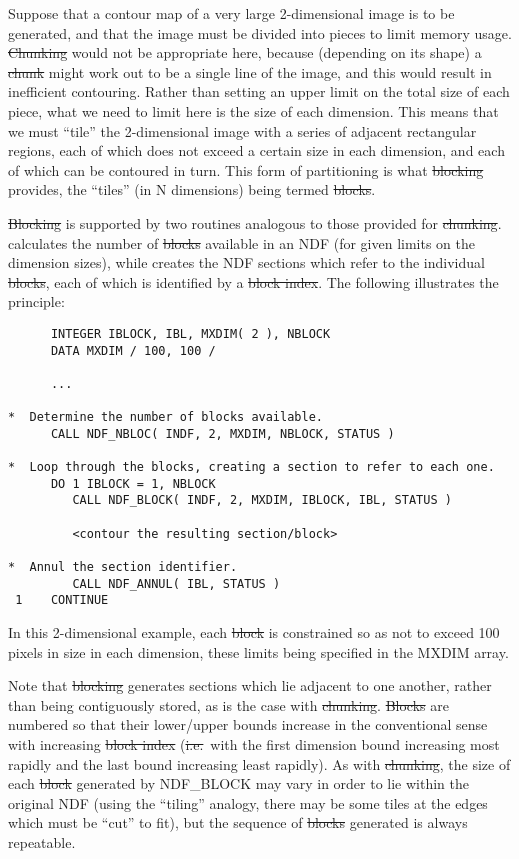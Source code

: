 Suppose that a contour map of a very large \mbox{2-dimensional} image is
to be generated, and that the image must be divided into pieces to limit
memory usage. \st{Chunking\/} would not be appropriate here, because
(depending on its shape) a \st{chunk\/} might work out to be a single
line of the image, and this would result in inefficient contouring.
Rather than setting an upper limit on the total size of each piece, what
we need to limit here is the size of each dimension. This means
that we must ``tile'' the 2-dimensional image with a series of adjacent
rectangular regions, each of which does not exceed a certain size in
each dimension, and each of which can be contoured in turn. This form of
partitioning is what \st{blocking\/} provides, the ``tiles'' (in N
dimensions) being termed \st{blocks}.

\st{Blocking\/} is supported by two routines analogous to those
provided for \st{chunking}.  calculates
the number of \st{blocks\/} available in an NDF (for given limits on
the dimension sizes), 
while  creates the NDF sections which refer to the individual
\st{blocks}, each of which is identified by a \st{block index}. The
following illustrates the principle:

\small
\begin{verbatim}
      INTEGER IBLOCK, IBL, MXDIM( 2 ), NBLOCK
      DATA MXDIM / 100, 100 /

      ...

*  Determine the number of blocks available.
      CALL NDF_NBLOC( INDF, 2, MXDIM, NBLOCK, STATUS )

*  Loop through the blocks, creating a section to refer to each one.
      DO 1 IBLOCK = 1, NBLOCK
         CALL NDF_BLOCK( INDF, 2, MXDIM, IBLOCK, IBL, STATUS )

         <contour the resulting section/block>

*  Annul the section identifier.
         CALL NDF_ANNUL( IBL, STATUS )
 1    CONTINUE
\end{verbatim}
\normalsize

In this 2-dimensional example, each \st{block\/} is constrained so as not to
exceed 100 pixels in size in each dimension, these limits being specified in the
MXDIM array.

Note that \st{blocking\/} generates sections which lie adjacent to one another,
rather than being contiguously stored, as is the case with
\st{chunking}. \st{Blocks\/} are numbered so that their lower/upper
bounds increase in the 
conventional sense with increasing \st{block index\/} (\st{i.e.}\ with the
first dimension bound increasing most rapidly and the last bound increasing
least rapidly). As with \st{chunking}, the size of each \st{block\/} generated
by NDF\_BLOCK may vary in order to lie within the original NDF (using the
``tiling'' analogy, there may be some tiles at the edges which must be ``cut''
to fit), but the sequence of \st{blocks\/} generated is always repeatable.

